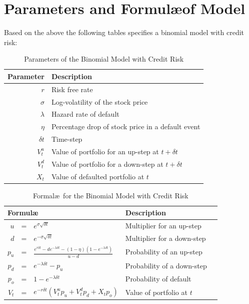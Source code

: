 \documentclass[a4paper,11pt,oneside]{report}
\theoremstyle{plain}
\theoremstyle{definition}
\def\Dt{\ensuremath{\delta t}\xspace}
\def\u{\ensuremath{u}\xspace}
\def\d{\ensuremath{d}\xspace}
\def\o{\ensuremath{o}\xspace}
\def\pu{\ensuremath{p_\u}\xspace}
\def\pd{\ensuremath{p_\d}\xspace}
\def\po{\ensuremath{p_\o}\xspace}
\def\V{\ensuremath{V_t}\xspace}
\def\Vu{\ensuremath{V^{u}_t}\xspace}
\def\Vd{\ensuremath{V^{d}_t}\xspace}
\def\X{\ensuremath{X_t}\xspace}
\begin{document}
\section{Parameters and Formul\ae of Model}
Based on the above the following tables specifies a binomial model with credit risk:

\begin{table}
\centering
\caption{Parameters of the Binomial Model with Credit Risk}
\begin{tabular}{|r|l|}\hline
 \textbf{Parameter} & \textbf{Description} \\\hline
 $r$            & Risk free rate \\\hline
 $\sigma$       & Log-volatility of the stock price \\\hline
 $\lambda$      & Hazard rate of default \\\hline
 $\eta$         & Percentage drop of stock price in a default event \\\hline
 \Dt            & Time-step \\\hline
 \Vu            & Value of portfolio for an up-step at $t + \Dt$ \\\hline
 \Vd            & Value of portfolio for a down-step at $t + \Dt$ \\\hline
 \X             & Value of defaulted portfolio at $t$\\\hline
\end{tabular}
\end{table}

\begin{table}
\centering
\caption{Formal\ae\ for the Binomial Model with Credit Risk}
\begin{tabular}{|rcl|l|l|}\hline
 \multicolumn{3}{|l|}{\textbf{Formul\ae}} & \textbf{Description} \\\hline
 \u     &=& $e^{\sigma\sqrt{\Dt}}$ &
    Multiplier for an up-step \\\hline
 \d     &=& $e^{-\sigma\sqrt{\Dt}}$ &
    Multiplier for a down-step \\\hline
 \pu    &=& $\frac{e^{r\Dt} - \d e^{-\lambda\Dt} - (1 - \eta)(1 - e^{-\lambda\Dt})}{\u - \d}$ &
    Probability of an up-step \\\hline
 \pd    &=& $e^{-\lambda\Dt} - \pu$ &
    Probability of a down-step \\\hline
 \po    &=& $1 - e^{-\lambda\Dt}$ &
    Probability of default \\\hline
 \V     &=& $e^{-r\Dt}(\Vu\pu + \Vd\pd + \X\po)$ &
    Value of portfolio at $t$ \\\hline
\end{tabular}
\end{table}
\end{document}
